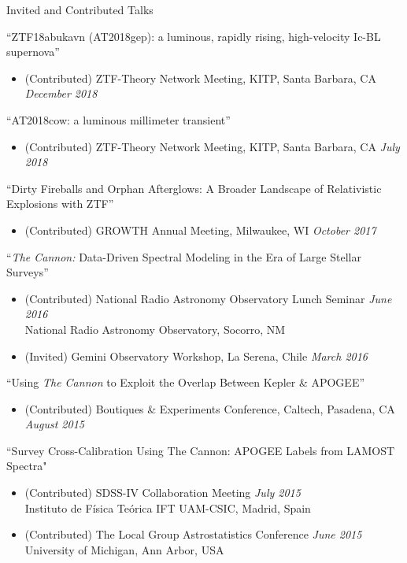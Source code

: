 \documentclass{resume} %
\begin{document}

\begin{rSection}{Invited and Contributed Talks}

``ZTF18abukavn (AT2018gep): a luminous, rapidly rising, high-velocity Ic-BL supernova''
\begin{itemize}
  \item
    (Contributed) ZTF-Theory Network Meeting, KITP, Santa Barbara, CA
    \hfill {\em December 2018}
\end{itemize}

``AT2018cow: a luminous millimeter transient''
\begin{itemize}
  \item
    (Contributed) ZTF-Theory Network Meeting, KITP, Santa Barbara, CA
    \hfill {\em July 2018}
\end{itemize}

``Dirty Fireballs and Orphan Afterglows: A Broader Landscape of Relativistic Explosions with ZTF''
\begin{itemize}
  \item
    (Contributed) GROWTH Annual Meeting, Milwaukee, WI
    \hfill {\em October 2017}
\end{itemize}

``\emph{The Cannon:} Data-Driven Spectral Modeling in the Era of Large Stellar Surveys''
\begin{itemize}
  \item
    (Contributed) National Radio Astronomy Observatory Lunch Seminar 
    \hfill {\em June 2016} \\
    National Radio Astronomy Observatory, Socorro, NM
  \item
  (Invited) Gemini Observatory Workshop, La Serena, Chile \hfill {\em March 2016}
\end{itemize}
``Using \emph{The Cannon} to Exploit the Overlap Between Kepler \& APOGEE''
\begin{itemize}
  \item
    (Contributed) Boutiques \& Experiments Conference, Caltech, Pasadena, CA \hfill {\em August 2015}
\end{itemize}
``Survey Cross-Calibration Using The Cannon: APOGEE Labels from LAMOST Spectra"
\begin{itemize}
\item
(Contributed) SDSS-IV Collaboration Meeting \hfill {\em July 2015} \\
Instituto de Física Teórica IFT UAM-CSIC, Madrid, Spain
\item
(Contributed) The Local Group Astrostatistics Conference \hfill {\em June 2015} \\
University of Michigan, Ann Arbor, USA
\end{itemize}


\end{rSection}
\end{document}
